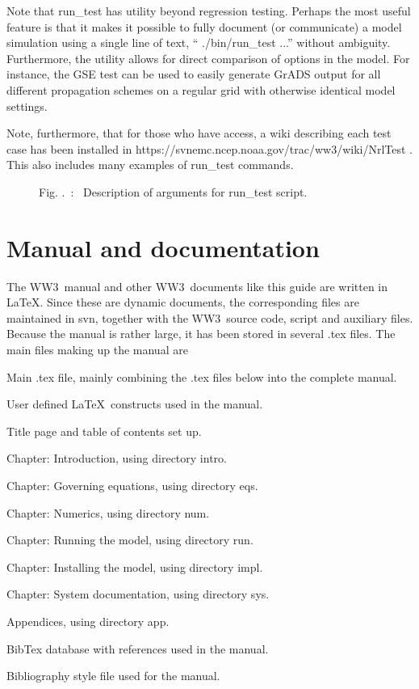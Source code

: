 \documentclass[12pt]{article}
\newcommand{\ws}{WW3}
\newcommand{\file}{\sf}
\newcommand{\pb}{\strut \vfill \pagebreak}
\newcommand{\newsec}{\setcounter{equation}{0}
                      \setcounter{myfigno}{0}
                      \setcounter{mytabno}{0}}
\newenvironment{flist}{\begin{list}{nofile ?}{\parsep 0mm
            \itemsep 0mm \leftmargin 35mm \labelwidth 25mm
            \rightmargin 10mm}}{\end{list}}
\newcommand{\fit}[2]{\item[{\file{#1}}\hfill]{#2}}
\newcounter{myfigno}[section]
\newenvironment{myfig}[1]{\begin{figure}[#1]
                         \refstepcounter{myfigno}}                       
                        {\end{figure}}
\newcommand{\myfcapc}[1]{\begin{center} \ff Fig. \themyfigno\ :~ #1
                         \end{center}}
\newcounter{mytabno}[section]
\renewcommand{\themyfigno}{\thesection.\arabic{myfigno}}
\begin{document}
Note that {\file run\_test} has utility beyond regression testing. Perhaps the
most useful feature is that it makes it possible to fully document (or
communicate) a model simulation using a single line of text, ``{\file
  ./bin/run\_test} ...'' without ambiguity. Furthermore, the utility allows
for direct comparison of options in the model. For instance, the GSE test can
be used to easily generate GrADS output for all different propagation schemes
on a regular grid with otherwise identical model settings.

Note, furthermore, that for those who have access, a wiki describing each test
case has been installed in {\file
  https://svnemc.ncep.noaa.gov/trac/ww3/wiki/NrlTest }. This also includes
many examples of {\file run\_test} commands.

\pb

\begin{myfig}{tbp}
\begin{center}
{\scriptsize \begin{minipage}[c]{4.5in}

\end{minipage} }
\end{center}
\myfcapc{Description of arguments for {\file run\_test} script.}
\label{fig:run_test}
\end{myfig}

\clearpage

\section{Manual and documentation} \label{sec:man}
\newsec

The \ws\ manual and other \ws\ documents like this guide are written in
\LaTeX. Since these are dynamic documents, the corresponding files are
maintained in svn, together with the \ws\ source code, script and auxiliary
files. Because the manual is rather large, it has been stored in several
{\file .tex} files. The main files making up the manual are

\begin{flist}
\fit{manual.tex}{Main {\file .tex} file, mainly combining the {\file .tex}
                 files below into the complete manual.}
\fit{defs.tex  }{User defined \LaTeX\ constructs used in the manual.}
\fit{start.tex }{Title page and table of contents set up.}
\fit{intro.tex }{Chapter: Introduction, using directory {\file intro}.}
\fit{eqs.tex   }{Chapter: Governing equations, using directory {\file eqs}.}
\fit{num.tex   }{Chapter: Numerics, using directory {\file num}.}
\fit{run.tex   }{Chapter: Running the model, using directory {\file run}.}
\fit{impl.tex  }{Chapter: Installing the model, using directory {\file impl}.}
\fit{sys.tex   }{Chapter: System documentation, using directory {\file sys}.}
\fit{app.tex   }{Appendices, using directory {\file app}.}
\fit{manual.bib}{BibTex database with references used in the manual.}
\fit{jas.bst   }{Bibliography style file used for the manual.}
\end{flist}
\end{document}
